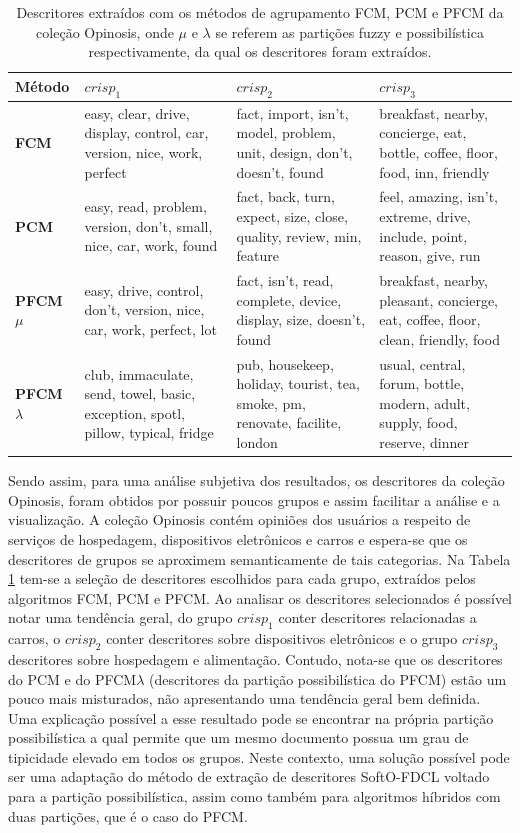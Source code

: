 \begin{table}[!htp]
  \centering
  \begin{tabular}{ |l|p{4cm} | p{4cm} | p{4cm}|}
    \hline
    {\bf Método} & $crisp_1$ & $crisp_2$ & $crisp_3$ \\
    \hline
    {\bf FCM} & easy, clear, drive, display, control, car, version, nice, work, perfect & fact,
    import, isn't, model, problem, unit, design, don't, doesn't, found & breakfast, nearby,
    concierge, eat, bottle, coffee, floor, food, inn, friendly \\
    \hline
    {\bf PCM} & easy, read, problem, version, don't, small, nice, car, work, found & fact, back,
    turn, expect, size, close, quality, review, min, feature & feel, amazing, isn't, extreme, drive,
    include, point, reason, give, run\\
    \hline
    {\bf PFCM $\mu$} & easy, drive, control, don't, version, nice, car, work, perfect, lot & fact,
    isn't, read, complete, device, display, size, doesn't, found & breakfast, nearby, pleasant,
    concierge, eat, coffee, floor, clean, friendly, food\\
    \hline
    {\bf PFCM $\lambda$} & club, immaculate, send, towel, basic, exception, spotl, pillow, typical,
    fridge & pub, housekeep, holiday, tourist, tea, smoke, pm, renovate, facilite, london & usual,
    central, forum, bottle, modern, adult, supply, food, reserve, dinner\\
    \hline
  \end{tabular}
  \caption{Descritores extraídos com os métodos de agrupamento FCM, PCM e PFCM da coleção Opinosis,
  onde $\mu$ e $\lambda$ se referem as partições fuzzy e possibilística respectivamente, da qual os
descritores foram extraídos.}
  \label{table:pfcmdescriptors}
\end{table}

Sendo assim, para uma análise subjetiva dos resultados, os descritores da coleção Opinosis, foram
obtidos por possuir poucos grupos e assim facilitar a análise e a visualização. A coleção Opinosis
contém opiniões dos usuários a respeito de serviços de hospedagem, dispositivos eletrônicos e carros
e espera-se que os descritores de grupos se aproximem semanticamente de tais categorias.  Na Tabela
\ref{table:pfcmdescriptors} tem-se a seleção de descritores escolhidos para cada grupo, extraídos
pelos algoritmos FCM, PCM e PFCM. Ao analisar os descritores selecionados é possível notar uma
tendência geral, do grupo $crisp_1$ conter descritores relacionadas a carros, o $crisp_2$ conter
descritores sobre dispositivos eletrônicos e o grupo $crisp_3$ descritores sobre hospedagem e
alimentação. Contudo, nota-se que os descritores do PCM e do PFCM$\lambda$ (descritores da partição
possibilística do PFCM) estão um pouco mais misturados, não apresentando uma tendência geral bem
definida. Uma explicação possível a esse resultado pode se encontrar na própria partição
possibilística a qual permite que um mesmo documento possua um grau de tipicidade elevado em todos
os grupos. Neste contexto, uma solução possível pode ser uma adaptação do método de extração de
descritores SoftO-FDCL voltado para a partição possibilística, assim como também para algoritmos
híbridos com duas partições, que é o caso do PFCM.

